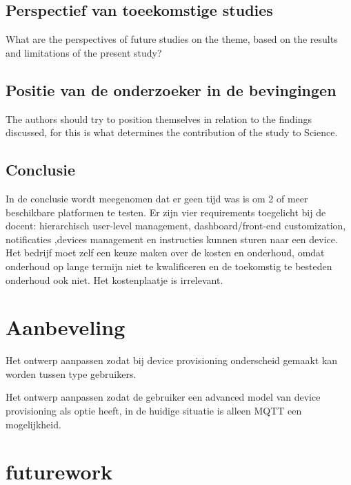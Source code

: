 		
		\section{Perspectief van toeekomstige studies}
		What are the perspectives of future studies on the theme, based on the results and limitations of the present study?
		
		\section{Positie van de onderzoeker in de bevingingen}
		The  authors  should  try  to  position  themselves  in  relation  to  the  findings discussed, for this is what determines the contribution of the study to Science.
		
		\section{Conclusie}
		
		
		In de conclusie wordt  meegenomen dat er geen tijd was is om 2 of meer beschikbare platformen te testen.  Er zijn vier requirements toegelicht bij de docent: hierarchisch user-level management, dashboard/front-end customization, notificaties ,devices management en instructies kunnen sturen naar een device. Het bedrijf moet zelf een keuze maken over de kosten en onderhoud, omdat onderhoud op lange termijn niet te kwalificeren en de toekomstig te besteden onderhoud ook niet. Het kostenplaatje is irrelevant.  
		
		
		
		\chapter{Aanbeveling}
		
		
		Het ontwerp aanpassen zodat bij device provisioning onderscheid gemaakt kan worden tussen type gebruikers.
		
		
		Het ontwerp aanpassen zodat de gebruiker een advanced model van device provisioning als optie heeft, in de huidige situatie is alleen MQTT een mogelijkheid.
		
		
		\begin{center}
		\end{center}
		
		\chapter{futurework}
		
